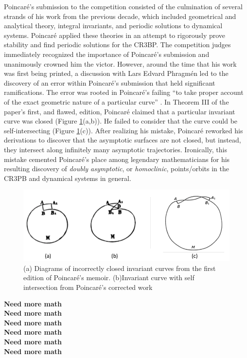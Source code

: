 \documentclass[11pt]{article} %
\begin{document}
Poincaré's submission to the competition consisted of the culmination of several strands of his work from the previous decade, which included geometrical and analytical theory, integral invariants, and periodic solutions to dynamical systems. Poincaré applied these theories in an attempt to rigorously prove stability and find periodic solutions for the CR3BP. The competition judges immediately recognized the importance of Poincaré's submission and unanimously crowned him the victor. However, around the time that his work was first being printed, a discussion with Lars Edvard Phragmén led to the discovery of an error within Poincaré's submission that held significant ramifications. The error was rooted in Poincaré's failing ``to take proper account of the exact geometric nature of a particular curve'' \cite{BarrowGreen1997}. In Theorem III of the paper's first, and flawed, edition, Poincaré claimed that a particular invariant curve was closed (Figure \ref{fig:curveIntersection1}(a,b)). He failed to consider that the curve could be self-intersecting (Figure \ref{fig:curveIntersection1}(c)). After realizing his mistake, Poincaré reworked his derivations to discover that the asymptotic surfaces are not closed, but instead, they intersect along infinitely many asymptotic trajectories. Ironically, this mistake cemented Poincaré's place among legendary mathematicians for his resulting discovery of \textit{doubly asymptotic}, or \textit{homoclinic}, points/orbits in the CR3PB and dynamical systems in general.  

\begin{figure}[H]
\centering
\includegraphics[width=5in]{curveIntersection1.png}\nonumber
\caption{(a) Diagrams of incorrectly closed invariant curves from the first edition of Poincaré's memoir. (b)Invariant curve with self intersection from Poincaré's corrected work \cite{BarrowGreen1997}}
\label{fig:curveIntersection1}
\end{figure}

\color{red}\textbf{Need more math}\color{black}\\
\color{red}\textbf{Need more math}\color{black}\\
\color{red}\textbf{Need more math}\color{black}\\
\color{red}\textbf{Need more math}\color{black}\\
\color{red}\textbf{Need more math}\color{black}\\
\color{red}\textbf{Need more math}\color{black}\\
\end{document}
